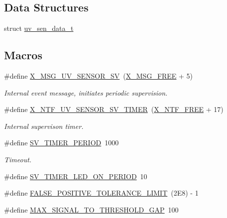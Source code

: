 \subsection*{Data Structures}
\begin{DoxyCompactItemize}
\item 
struct \hyperlink{a00035_d9/d30/a00848}{uv\+\_\+sen\+\_\+data\+\_\+t}
\end{DoxyCompactItemize}
\subsection*{Macros}
\begin{DoxyCompactItemize}
\item 
\#define \hyperlink{a00035_a88ce8cfec1a4d1cf613a890254880e24}{X\+\_\+\+M\+S\+G\+\_\+\+U\+V\+\_\+\+S\+E\+N\+S\+O\+R\+\_\+\+S\+V}~(\hyperlink{a00036_a082eb6e82ded25b00f04da4f611c961e}{X\+\_\+\+M\+S\+G\+\_\+\+F\+R\+E\+E} + 5)
\begin{DoxyCompactList}\small\item\em Internal event message, initiates periodic supervision. \end{DoxyCompactList}\item 
\#define \hyperlink{a00035_a2ab2f7f60fff32ecaf2859625e76a868}{X\+\_\+\+N\+T\+F\+\_\+\+U\+V\+\_\+\+S\+E\+N\+S\+O\+R\+\_\+\+S\+V\+\_\+\+T\+I\+M\+E\+R}~(\hyperlink{a00036_ab2eeea4643823a0c7c7731ddb83e3edc}{X\+\_\+\+N\+T\+F\+\_\+\+F\+R\+E\+E} + 17)
\begin{DoxyCompactList}\small\item\em Internal supervison timer. \end{DoxyCompactList}\item 
\#define \hyperlink{a00035_a8a535456285f4602701c814d7b69cc68}{S\+V\+\_\+\+T\+I\+M\+E\+R\+\_\+\+P\+E\+R\+I\+O\+D}~1000
\begin{DoxyCompactList}\small\item\em Timeout. \end{DoxyCompactList}\item 
\#define \hyperlink{a00035_a44e4917fdf9d2a3574a3dd34537d97a7}{S\+V\+\_\+\+T\+I\+M\+E\+R\+\_\+\+L\+E\+D\+\_\+\+O\+N\+\_\+\+P\+E\+R\+I\+O\+D}~10
\item 
\#define \hyperlink{a00035_aa88a423475bb5b13601785eed80fb1b9}{F\+A\+L\+S\+E\+\_\+\+P\+O\+S\+I\+T\+I\+V\+E\+\_\+\+T\+O\+L\+E\+R\+A\+N\+C\+E\+\_\+\+L\+I\+M\+I\+T}~(2\+E8) -\/ 1
\item 
\#define \hyperlink{a00035_a4131fea6179b36b90522dd6a9ecc0a73}{M\+A\+X\+\_\+\+S\+I\+G\+N\+A\+L\+\_\+\+T\+O\+\_\+\+T\+H\+R\+E\+S\+H\+O\+L\+D\+\_\+\+G\+A\+P}~100
\end{DoxyCompactItemize}
